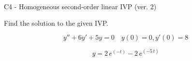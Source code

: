 \begin{exercise}
  \begin{exerciseTitle}C4 - Homogeneous second-order linear IVP (ver. 2)\end{exerciseTitle}
  \begin{exerciseStatement}
    
Find the solution to the given IVP.

    
\[y''+6y'+5y = 0 \hspace{1em} y(0) = 0 , y'(0) = 8\]

  \end{exerciseStatement}
  \begin{exerciseAnswer}
    
\[y= 2 \, e^{\left(-t\right)} - 2 \, e^{\left(-5 \, t\right)}\]

  \end{exerciseAnswer}
\end{exercise}